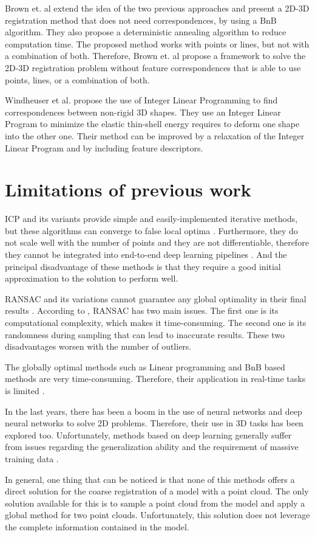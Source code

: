     Brown et. al \cite{Brown_2015_globally} extend the idea of the two previous approaches and present a 2D-3D registration method that does not need
    correspondences, by using a BnB algorithm. They also propose a deterministic annealing algorithm to reduce computation time.
    The proposed method works with points or lines, but not with a combination of both.
    Therefore, Brown et. al \cite{Brown_2019_afamily} propose a framework to solve the 2D-3D registration problem without feature correspondences
    that is able to use points, lines, or a combination of both.

    Windheuser et al. \cite{Windheuser_2011_largescale} propose the use of Integer Linear Programming to find correspondences between non-rigid 3D shapes.
    They use an Integer Linear Program to minimize the elastic thin-shell energy requires to deform one shape into the other one.
    Their method can be improved by a relaxation of the Integer Linear Program and by including feature descriptors.

    \section{Limitations of previous work}
    ICP and its variants provide simple and easily-implemented iterative methods, but these algorithms can converge to false local optima \cite{Wang_2019_deepclosest}.
    Furthermore, they do not scale well with the number of points and they are not differentiable, therefore they cannot be integrated into end-to-end
    deep learning pipelines \cite{Sarode_2019_oneframework}. 
    And the principal disadvantage of these methods is that they require a good initial approximation to the solution to perform well.
    
    RANSAC and its variations cannot guarantee any global optimality in their final results \cite{Bazin_2013_abranchandbound}.
    According to \cite{Quan_2020_com}, RANSAC has two main issues. 
    The first one is its computational complexity, which makes it time-consuming.
    The second one is its randomness during sampling that can lead to inaccurate results.
    These two disadvantages worsen with the number of outliers.

    The globally optimal methods such as Linear programming and BnB based methods are very time-consuming. 
    Therefore, their application in real-time tasks is limited \cite{Sarode_2019_oneframework}.

    In the last years, there has been a boom in the use of neural networks and deep neural networks to solve 2D problems.
    Therefore, their use in 3D tasks has been explored too.
    Unfortunately, methods based on deep learning generally suffer from issues regarding the generalization ability and the requirement of massive training data \cite{Quan_2020_com}.

    In general, one thing that can be noticed is that none of this methods offers a direct solution for the coarse registration of a model with a point cloud.
    The only solution available for this is to sample a point cloud from the model and apply a global method for two point clouds.
    Unfortunately, this solution does not leverage the complete information contained in the model.


